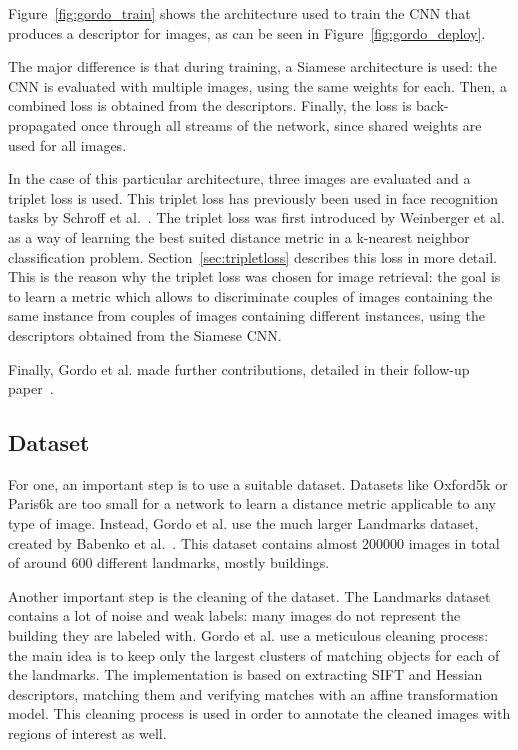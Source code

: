 Figure~\ref{fig:gordo_train} shows the architecture used to train the CNN
that produces a descriptor for images, as can be seen in
Figure~\ref{fig:gordo_deploy}.

The major difference is that during training, a Siamese architecture is
used: the CNN is evaluated with multiple images, using the same weights
for each. Then, a combined loss is obtained from the descriptors.
Finally, the loss is back-propagated once through all streams of the network,
since shared weights are used for all images.

In the case of this particular architecture, three images are evaluated
and a triplet loss is used. This triplet loss has previously been used
in face recognition tasks by Schroff et al.~\cite{schroff_facenet:_2015}.
The triplet loss was first introduced by
Weinberger et al.~\cite{weinberger_distance_2006} as a way of learning
the best suited distance metric in a k-nearest neighbor classification
problem. Section~\ref{sec:tripletloss} describes this loss in more detail.
This is the reason why the triplet loss was chosen for image retrieval:
the goal is to learn a metric which allows to discriminate couples of
images containing the same instance from couples of images containing
different instances, using the descriptors obtained from the Siamese
CNN.

Finally, Gordo et al. made further contributions, detailed in their
follow-up paper~\cite{gordo_end--end_2016}.
\subsection{Dataset}
For one, an important step is to use a suitable dataset. Datasets like
Oxford5k or Paris6k are too small for a network to learn a distance metric
applicable to any type of image. Instead, Gordo et al. use the much larger
Landmarks dataset, created by Babenko et al.~\cite{babenko_neural_2014}.
This dataset contains almost 200000 images in total of around 600
different landmarks, mostly buildings.

Another important step is the cleaning of the dataset. The Landmarks
dataset contains a lot of noise and weak labels: many images do not
represent the building they are labeled with. Gordo et al. use a meticulous
cleaning process: the main idea is to keep only the largest clusters
of matching objects for each of the landmarks. The implementation is
based on extracting SIFT and Hessian descriptors,
matching them and verifying matches with an affine transformation model.
This cleaning process is used in order to annotate the cleaned images
with regions of interest as well.

